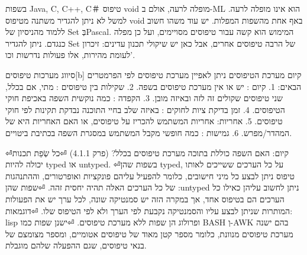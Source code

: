\begin{טבלא}[!htbp]
      בשפות Java, C, C++, C＃ טיפוס void מופלה לרעה, אולם ב-ML הוא אינו מופלה לרעה. למשל לא ניתן להגדיר משתנה מטיפוס void באף אחת מהשפות המפלות.
      יש עוד משהו חשוב ללמוד מהניסיון של Set בְּPascal. המימוש הוא קשה עבור טיפוסים מסויימים, ועל כן מפלה כנגדם. ניתן להגדיר Set של הרבה טיפוסים אחרים, אבל כאן יש שיקולי תכנון עדינים: זיכרון לעומת מהירות, אלו פעולות נדרשות וכו'.

      סיווג מערכות טיפוסים[b]
      קיום מערכת הטיפוסים
      ניתן לאפיין מערכת טיפוסים לפי הפרמטרים הבאים:
      1. קיום : יש או אין מערכת טיפוסים בשפה.
      2. שקילות בין טיפוסים : מתי, אם בכלל, שני טיפוסים שקולים זה לזה ובאיזה מובן.
      3. הקפדה : כמה נוקשית השפה באכיפת חוקי הטיפוסים.
      4. זמן בדיקת ציות לחוקים : באיזה שלב בחיי התוכנה נבדקת תקינות לפי חוקי טיפוסים.
      5. אחריות: אחריות המשתמש להכריז על טיפוסים, או האם האחריות היא של המהדר/מפרש.
      6. גמישות : כמה חופשי מקבל המשתמש במסגרת השפה בכתיבת ביטויים.

⏎קיום: האם השפה כוללת בתוכה מערכת טיפוסים בכלל? (פרק 4.1.1)
⏎כל שְׂפַת תכנות יכולה להיות typed או untyped.
⏎בשפות שהן typed, על כל הערכים ששייכים לאותו טיפוס ניתן לבצע כל מיני חישובים, כלומר להפעיל עליהם פונקציות ואופרטורים, וההתנהגות של כל הערכים האלה תהיה יחסית זהה.
⏎שפות שהן :untyped ניתן לחשוב עליהן כאילו כל הערכים הם בטיפוס אחד, אך במקרה הזה יש סמנטיקה שונה, לכל ערך יש את הפעולות המותרות שניתן לבצע עליו והסמנטיקה נקבעת לפי הערך ולא לפי הטיפוס שלו.
⏎דוגמאות: lisp ופרולוג הן שפות ללא מערכת טיפוסים.
⏎ישנן שפות כמו BASH וְ-AWK בהם ישנה מערכת טיפוסים מנוונת, כלומר מספר קטן מאוד של טיפוסים אטומיים, ומספר מצומצם של בנאי טיפוסים, שגם ההפעלה שלהם מוגבלת.


\end{טבלא}
